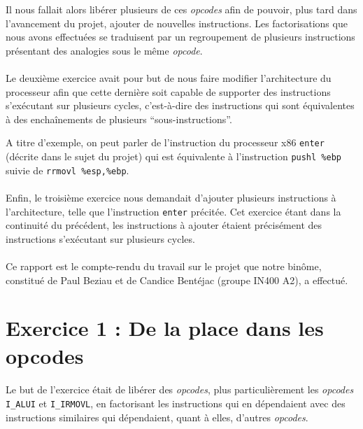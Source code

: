 \documentclass[12pt]{article}
\begin{document}
Il nous fallait alors libérer plusieurs de ces {\itshape opcodes} afin de pouvoir, plus tard dans l'avancement du projet, ajouter de nouvelles instructions. Les factorisations que nous avons effectuées se traduisent par un regroupement de plusieurs instructions présentant des analogies sous le même {\itshape opcode}.

\paragraph{}Le deuxième exercice avait pour but de nous faire modifier l'architecture du processeur afin que cette dernière soit capable de supporter des instructions s'exécutant sur plusieurs cycles, c'est-à-dire des instructions qui sont équivalentes à des enchaînements de plusieurs ``sous-instructions''.

A titre d'exemple, on peut parler de l'instruction du processeur x86 \verb+enter+ (décrite dans le sujet du projet) qui est équivalente à l'instruction \verb+pushl %ebp+ suivie de \verb+rrmovl %esp,%ebp+.

\paragraph{}Enfin, le troisième exercice nous demandait d'ajouter plusieurs instructions à l'architecture, telle que l'instruction \verb+enter+ précitée. Cet exercice étant dans la continuité du précédent, les instructions à ajouter étaient précisément des instructions s'exécutant sur plusieurs cycles.

\paragraph{}Ce rapport est le compte-rendu du travail sur le projet que notre binôme, constitué de Paul Beziau et de Candice Bentéjac (groupe IN400 A2), a effectué.



\section{Exercice 1 : De la place dans les opcodes}
\paragraph{}Le but de l'exercice était de libérer des {\itshape opcodes}, plus particulièrement les {\itshape opcodes} \verb+I_ALUI+ et \verb+I_IRMOVL+, en factorisant les instructions qui en dépendaient avec des instructions similaires qui dépendaient, quant à elles, d'autres {\itshape opcodes}.
\end{document}
